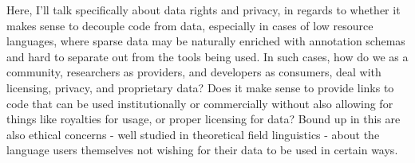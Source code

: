 Here, I'll talk specifically about data rights and privacy, in regards to whether it makes sense to decouple code from data, especially in cases of low resource languages, where sparse data may be naturally enriched with annotation schemas and hard to separate out from the tools being used. In such cases, how do we as a community, researchers as providers, and developers as consumers, deal with licensing, privacy, and proprietary data? Does it make sense to provide links to code that can be used institutionally or commercially without also allowing for things like royalties for usage, or proper licensing for data? Bound up in this are also ethical concerns - well studied in theoretical field linguistics - about the language users themselves not wishing for their data to be used in certain ways.



%
%


